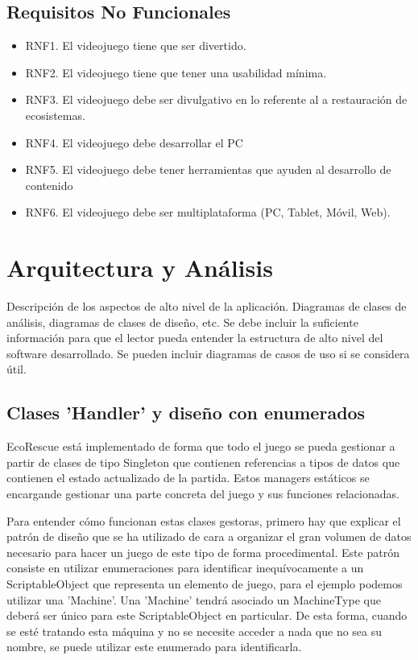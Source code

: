 \subsection{Requisitos No Funcionales}

\begin{itemize}
    \item RNF1. El videojuego tiene que ser divertido.
    \item RNF2. El videojuego tiene que tener una usabilidad mínima.
    \item RNF3. El videojuego debe ser divulgativo en lo referente al a restauración de ecosistemas.
    \item RNF4. El videojuego debe desarrollar el PC
    \item RNF5. El videojuego debe tener herramientas que ayuden al desarrollo de contenido
    \item RNF6. El videojuego debe ser multiplataforma (PC, Tablet, Móvil, Web).
\end{itemize}

\section{Arquitectura y Análisis}

Descripción de los aspectos de alto nivel de la aplicación. Diagramas de clases de análisis, diagramas de clases de diseño, etc. Se debe incluir la suficiente información para que el lector pueda entender la estructura de alto nivel del software desarrollado. Se pueden incluir diagramas de casos de uso si se considera útil.

\subsection{Clases 'Handler' y diseño con enumerados}
EcoRescue está implementado de forma que todo el juego se pueda gestionar a partir de clases de tipo Singleton que contienen referencias a tipos de datos que contienen el estado actualizado de la partida. Estos managers estáticos se encargande gestionar una parte concreta del juego y sus funciones relacionadas.

Para entender cómo funcionan estas clases gestoras, primero hay que explicar el patrón de diseño que se ha utilizado de cara a organizar el gran volumen de datos necesario para hacer un juego de este tipo de forma procedimental. Este patrón consiste en utilizar enumeraciones para identificar inequívocamente a un ScriptableObject que representa un elemento de juego, para el ejemplo podemos utilizar una 'Machine'. Una 'Machine' tendrá asociado un MachineType que deberá ser único para este ScriptableObject en particular. De esta forma, cuando se esté tratando esta máquina y no se necesite acceder a nada que no sea su nombre, se puede utilizar este enumerado para identificarla. 

